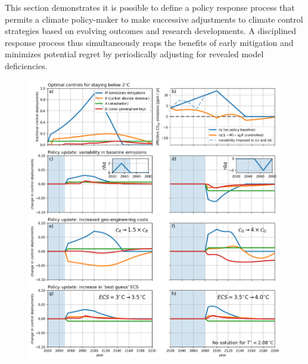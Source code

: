\documentclass{article}
\begin{document}
This section demonstrates it is possible to define a policy response process that permits a climate policy-maker to make successive adjustments to climate control strategies based on evolving outcomes and research developments. A disciplined response process thus simultaneously reaps the benefits of early mitigation and minimizes potential regret by periodically adjusting for revealed model deficiencies.

\begin{figure}[htb!]
\noindent\includegraphics[width=1.0\textwidth]{figures/policy_updates.png}
\centering
\caption{}
\label{fig.policy_updates}
\end{figure}



\end{document}
